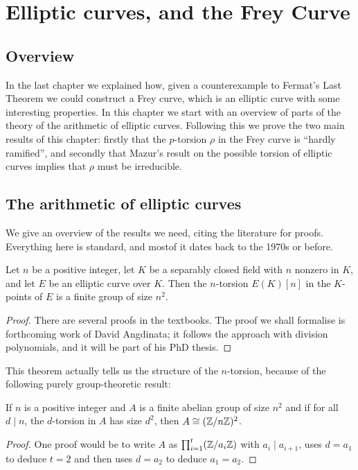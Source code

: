 \chapter{Elliptic curves, and the Frey Curve}

\section{Overview}

In the last chapter we explained how, given a counterexample to Fermat's Last Theorem we could construct a Frey curve, which is an elliptic curve with some interesting properties. In this chapter we start with an overview of parts of the theory of the arithmetic of elliptic curves. Following
this we prove the two main results of this chapter: firstly that the $p$-torsion $\rho$ in the Frey curve is ``hardly ramified'', and secondly that Mazur's result on the possible torsion of elliptic curves implies that $\rho$ must be irreducible.

\section{The arithmetic of elliptic curves}

We give an overview of the results we need, citing the literature for proofs. Everything here is
 standard, and mostof it dates back to the 1970s or before.

\begin{theorem}\label{Elliptic_curve_n_torsion_size}\tangled{}
  Let $n$ be a positive integer, let $K$ be a separably closed
  field with $n$ nonzero in $K$, and let $E$ be an elliptic curve over $K$. Then the $n$-torsion $E(K)[n]$ 
  in the $K$-points of $E$ is a finite group of size $n^2$.
\end{theorem}
\begin{proof}
  There are several proofs in the textbooks. The proof we shall formalise is forthcoming work of David Angdinata; it follows the approach with division polynomials, and it will be part of his PhD thesis.
\end{proof}

This theorem actually tells us the structure of the $n$-torsion, because of the following
purely group-theoretic result:
\begin{lemma}\label{group_theory_lemma}
  If $n$ is a positive integer and $A$ is a finite
  abelian group of size $n^2$ and if for all $d\mid n$, the $d$-torsion in $A$ has size $d^2$, 
  then $A\cong (\mathbb{Z}/n\mathbb{Z})^2$. 
\end{lemma}
\begin{proof}
  One proof would be to write $A$ as $\prod_{i=1}^t(\mathbb{Z}/a_i\mathbb{Z})$
  with $a_i\mid a_{i+1}$, uses $d=a_1$ to deduce $t=2$ and then uses $d=a_2$ to deduce $a_1=a_2$.
\end{proof}

